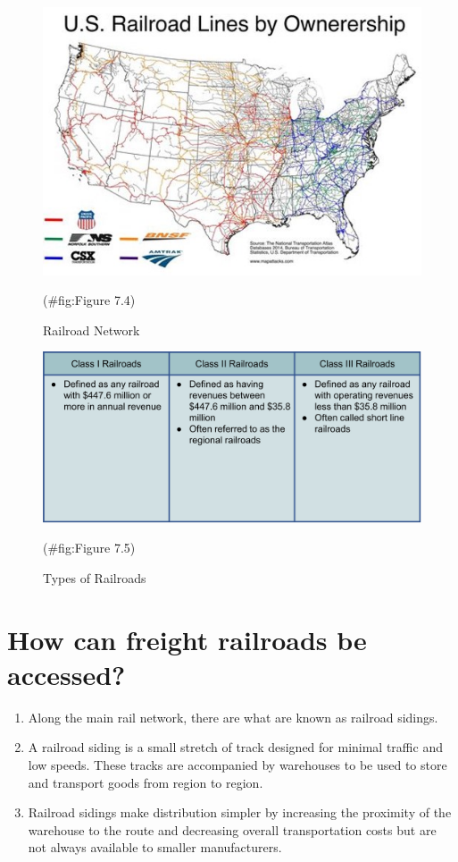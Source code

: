 \documentclass[
]{book}
\begin{document}
\begin{figure}

{\centering \includegraphics{./Images/supplychain/Railroad Network} 

}

\caption{Railroad Network}(\#fig:Figure 7.4)
\end{figure}

\begin{figure}

{\centering \includegraphics{./Images/supplychain/Types of Railroads} 

}

\caption{Types of Railroads}(\#fig:Figure 7.5)
\end{figure}

\hypertarget{SupplyChain-Railroad}{%
\section{How can freight railroads be accessed?}\label{SupplyChain-Railroad}}

\begin{enumerate}
\def\labelenumi{\arabic{enumi}.}
\item
  Along the main rail network, there are what are known as railroad sidings.
\item
  A railroad siding is a small stretch of track designed for minimal traffic and low speeds. These tracks are accompanied by warehouses to be used to store and transport goods from region to region.
\item
  Railroad sidings make distribution simpler by increasing the proximity of the warehouse to the route and decreasing overall transportation costs but are not always available to smaller manufacturers.
\end{enumerate}
\end{document}
